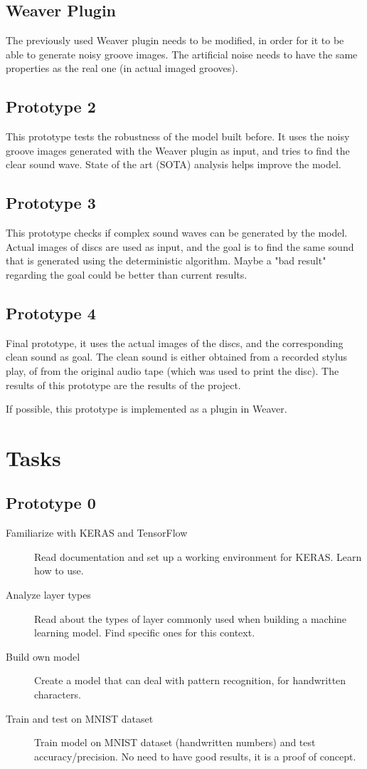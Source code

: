 \documentclass[12pt, twoside]{article}
\begin{document}
\subsection{Weaver Plugin}
The previously used Weaver plugin needs to be modified, in order for it to be able to generate noisy groove images. The artificial noise needs to have the same properties as the real one (in actual imaged grooves).
\subsection{Prototype 2}
This prototype tests the robustness of the model built before. It uses the noisy groove images generated with the Weaver plugin as input, and tries to find the clear sound wave. State of the art (SOTA) analysis helps improve the model.
\subsection{Prototype 3}
This prototype checks if complex sound waves can be generated by the model. Actual images of discs are used as input, and the goal is to find the same sound that is generated using the deterministic algorithm. Maybe a "bad result" regarding the goal could be better than current results.
\subsection{Prototype 4}
Final prototype, it uses the actual images of the discs, and the corresponding clean sound as goal. The clean sound is either obtained from a recorded stylus play, of from the original audio tape (which was used to print the disc). The results of this prototype are the results of the project.

If possible, this prototype is implemented as a plugin in Weaver.  
\section{Tasks}
\subsection{Prototype 0}
\begin{description}
	\item[Familiarize with KERAS and TensorFlow] Read documentation and set up a working environment for KERAS. Learn how to use.
	 \item[Analyze layer types] Read about the types of layer commonly used when building a machine learning model. Find specific ones for this context.
	 \item[Build own model] Create a model that can deal with pattern recognition, for handwritten characters.
	 \item[Train and test on MNIST dataset] Train model on MNIST dataset (handwritten numbers) and test accuracy/precision. No need to have good results, it is a proof of concept.
\end{description}
\end{document}
